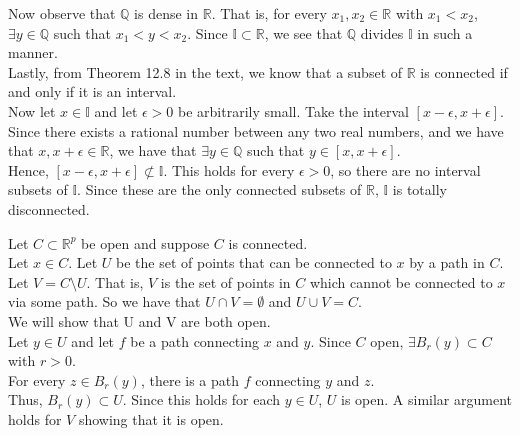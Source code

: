 \documentclass[12pt]{article}
\newenvironment{problem}[2][Problem]{\begin{trivlist}
\item[\hskip \labelsep {\bfseries #1}\hskip \labelsep {\bfseries #2.}]}{\end{trivlist}}
\begin{document}
Now observe that $\mathbb{Q}$ is dense in $\mathbb{R}$. That is, for every $x_1, x_2 \in \mathbb{R}$ with $x_1 < x_2$, $\exists y \in \mathbb{Q}$ such that $x_1 < y < x_2$. Since $\mathbb{I} \subset \mathbb{R}$, we see that $\mathbb{Q}$ divides $\mathbb{I}$ in such a manner.\\

Lastly, from Theorem 12.8 in the text, we know that a subset of $\mathbb{R}$ is connected if and only if it is an interval.\\

Now let $x \in \mathbb{I}$ and let $\epsilon > 0$ be arbitrarily small. Take the interval $[x - \epsilon, x + \epsilon]$. Since there exists a rational number between any two real numbers, and we have that $x, x + \epsilon \in \mathbb{R}$, we have that $\exists y \in \mathbb{Q}$ such that $y \in [x, x + \epsilon]$.\\

Hence, $[x - \epsilon, x + \epsilon] \not\subset \mathbb{I}$. This holds for every $\epsilon > 0$, so there are no interval subsets of $\mathbb{I}$. Since these are the only connected subsets of $\mathbb{R}$, $\mathbb{I}$ is totally disconnected.

\begin{problem}{3}
\end{problem}

Let $C \subset \mathbb{R}^p$ be open and suppose $C$ is connected.\\

Let $x \in C$. Let $U$ be the set of points that can be connected to $x$ by a path in $C$.\\

Let $V = C \setminus U$. That is, $V$ is the set of points in $C$ which cannot be connected to $x$ via some path. So we have that $U \cap V = \emptyset$ and $U \cup V = C$.\\

We will show that U and V are both open.\\

Let $y \in U$ and let $f$ be a path connecting $x$ and $y$. Since $C$ open, $\exists B_r(y) \subset C$ with $r > 0$.\\

For every $z \in B_r(y)$, there is a path $f$ connecting $y$ and $z$.\\

Thus, $B_r(y) \subset U$. Since this holds for each $y \in U$, $U$ is open. A similar argument holds for $V$ showing that it is open.\\
\end{document}
